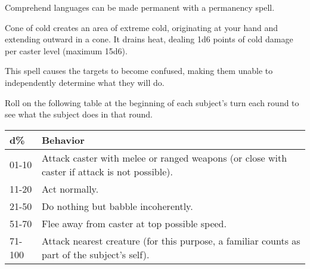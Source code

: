 \begin{multicols}{2}
\begin{small}
\smallskip\noindent Comprehend languages can be made permanent with a permanency spell.


\noindent Cone of cold creates an area of extreme cold, originating at your hand and extending outward in a cone. It drains heat, dealing 1d6 points of cold damage per caster level (maximum 15d6).


\noindent This spell causes the targets to become confused, making them unable to independently determine what they will do.

\smallskip\noindent Roll on the following table at the beginning of each subject's turn each round to see what the subject does in that round.

\begin{center}
\begin{tabular}[h!]{l p{2.5in}}
d\% & Behavior \\ \hline
01-10 & Attack caster with melee or ranged weapons (or close with caster if attack is not possible). \\
11-20 & Act normally. \\
21-50 & Do nothing but babble incoherently. \\
51-70 & Flee away from caster at top possible speed. \\
71-100 & Attack nearest creature (for this purpose, a familiar counts as part of the subject's self). \\
\end{tabular}
\end{center}


\end{small}
\end{multicols}
